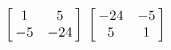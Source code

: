 {$\left[\hskip -3pt \begin{array}{cc} 1&5\\  -5&-24\end {array} \hskip -3pt
 \right]$ 
 }
{$\left[\hskip -3pt \begin{array}{cc} -24&-5\\  5&1\end {array} \hskip -3pt
 \right]$ }
